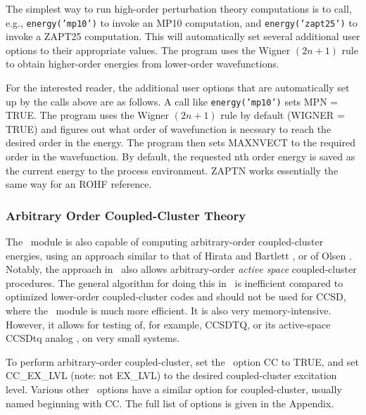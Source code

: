 The simplest way to run high-order perturbation theory computations is to
call, e.g., {\tt energy('mp10')} to invoke an MP10 computation, and
{\tt energy('zapt25')} to invoke a ZAPT25 computation.  This will
automatically set several additional user options to their appropriate
values.  The program uses the Wigner $(2n+1)$ rule to obtain higher-order
energies from lower-order wavefunctions.

For the interested reader, the additional user options that are
automatically set up by the calls above are as follows.  A call like
{\tt energy('mp10')} sets MPN = TRUE.  The program uses the Wigner
$(2n+1)$ rule by default (WIGNER = TRUE) and figures out what order
of wavefunction is necssary to reach the desired order in the energy.
The program then sets MAXNVECT to the required order in the wavefunction.
By default, the requested n{th} order energy is saved as the current energy
to the process environment.   ZAPTN works essentially the same way for an
ROHF reference.

\subsubsection{Arbitrary Order Coupled-Cluster Theory} The
\PSIdetci\ module is also capable of computing arbitrary-order
coupled-cluster energies, using an approach similar to that of Hirata
and Bartlett \cite{Hirata:2000:216}, or of Olsen \cite{Olsen:2000:7140}.
Notably, the approach in \PSIdetci\ also allows arbitrary-order {\em
active space} coupled-cluster procedures.  The general algorithm
for doing this in \PSIdetci\ is inefficient compared to optimized
lower-order coupled-cluster codes and should not be used for CCSD,
where the \PSIccenergy\ module is much more efficient.  It is also very
memory-intensive.  However, it allows for testing of, for example,
CCSDTQ, or its active-space CCSDtq analog \cite{Piecuch:1999:6103},
on very small systems.

To perform arbitrary-order coupled-cluster, set the \PSIdetci\ option
CC to TRUE, and set CC\_EX\_LVL (note: not EX\_LVL) to the desired
coupled-cluster excitation level.  Various other \PSIdetci\ options have a
similar option for coupled-cluster, usually named beginning with CC.  The
full list of options is given in the Appendix.


